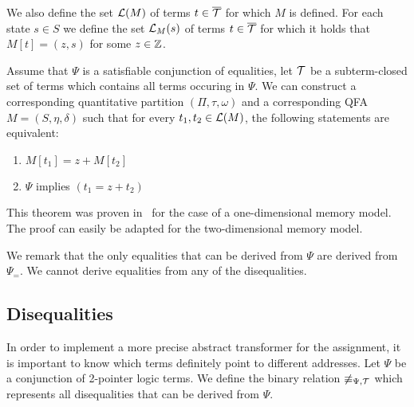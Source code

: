 We also define the set $\mathcal{L}(M)$ of terms $t \in {\overline{\mathcal{T}}}$ for which $M$ is defined.
For each state $s \in S$ we define the set $\mathcal{L}_M(s)$ of terms $t \in {\overline{\mathcal{T}}}$ for which it holds that $M[t] = (z, s)$ for some $z \in \mathbb{Z}$.
\begin{theorem}
  Assume that $\Psi$ is a satisfiable conjunction of equalities, let $\mathcal{T}$ be a subterm-closed set of terms which contains all terms occuring in $\Psi$. We can construct a corresponding quantitative partition $(\Pi, \tau,\omega)$
  and a corresponding QFA $M = (S, \eta, \delta)$ such that for every $t_1, t_2 \in \mathcal{L}(M)$, the following statements are equivalent:
  \begin{enumerate}
    \item $M[t_1] = z + M[t_2]$
    \item $\Psi$ implies $(t_1 = z + t_2)$
  \end{enumerate}
\end{theorem}

This theorem was proven in~\cite{2pointer} for the case of a one-dimensional memory model.
The proof can easily be adapted for the two-dimensional memory model.

We remark that the only equalities that can be derived from $\Psi$ are derived from $\Psi_=$. We cannot derive equalities from any of the disequalities.

\subsection{Disequalities}\label{disequalities}

In order to implement a more precise abstract transformer for the assignment, it is important to know which terms definitely
point to different addresses. Let $\Psi$ be a conjunction of 2-pointer logic terms.
We define the binary relation $\not\equiv_{\Psi,\mathcal{T}}$ which represents all disequalities that can be derived from $\Psi$.

